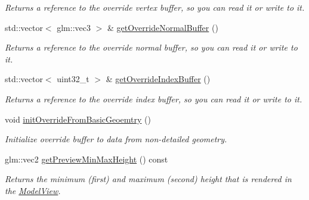 \begin{DoxyCompactItemize}
\begin{DoxyCompactList}\small\item\em Returns a reference to the override vertex buffer, so you can read it or write to it. \end{DoxyCompactList}\item 
\mbox{\label{classpepr3d_1_1_model_view_abe2f0a133e9bb7aa5cb1fba102f4a1e1}} 
std\+::vector$<$ glm\+::vec3 $>$ \& \mbox{\hyperlink{classpepr3d_1_1_model_view_abe2f0a133e9bb7aa5cb1fba102f4a1e1}{get\+Override\+Normal\+Buffer}} ()
\begin{DoxyCompactList}\small\item\em Returns a reference to the override normal buffer, so you can read it or write to it. \end{DoxyCompactList}\item 
\mbox{\label{classpepr3d_1_1_model_view_a8cbad5b695e0e63ff5b77545bcc77286}} 
std\+::vector$<$ uint32\+\_\+t $>$ \& \mbox{\hyperlink{classpepr3d_1_1_model_view_a8cbad5b695e0e63ff5b77545bcc77286}{get\+Override\+Index\+Buffer}} ()
\begin{DoxyCompactList}\small\item\em Returns a reference to the override index buffer, so you can read it or write to it. \end{DoxyCompactList}\item 
\mbox{\label{classpepr3d_1_1_model_view_ae6cfd84f9d3dc6d3c98e8dcc905dba42}} 
void \mbox{\hyperlink{classpepr3d_1_1_model_view_ae6cfd84f9d3dc6d3c98e8dcc905dba42}{init\+Override\+From\+Basic\+Geoemtry}} ()
\begin{DoxyCompactList}\small\item\em Initialize override buffer to data from non-\/detailed geometry. \end{DoxyCompactList}\item 
\mbox{\label{classpepr3d_1_1_model_view_aa7a7110a5396aee8bb3261c8d191dc28}} 
glm\+::vec2 \mbox{\hyperlink{classpepr3d_1_1_model_view_aa7a7110a5396aee8bb3261c8d191dc28}{get\+Preview\+Min\+Max\+Height}} () const
\begin{DoxyCompactList}\small\item\em Returns the minimum (first) and maximum (second) height that is rendered in the \mbox{\hyperlink{classpepr3d_1_1_model_view}{Model\+View}}. \end{DoxyCompactList}\item 

\end{DoxyCompactItemize}
